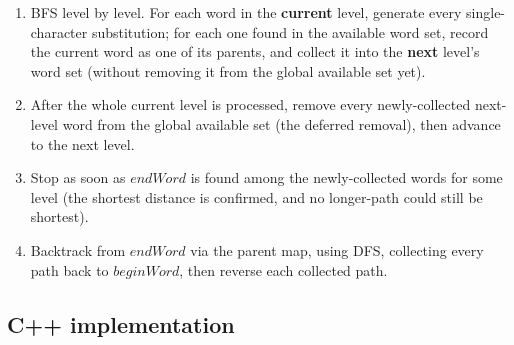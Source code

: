 \begin{enumerate}
  \item BFS level by level. For each word in the \textbf{current}
        level, generate every single-character substitution; for each
        one found in the available word set, record the current word
        as one of its parents, and collect it into the \textbf{next}
        level's word set (without removing it from the global
        available set yet).
  \item After the whole current level is processed, remove every
        newly-collected next-level word from the global available set
        (the deferred removal), then advance to the next level.
  \item Stop as soon as $\textit{endWord}$ is found among the
        newly-collected words for some level (the shortest distance is
        confirmed, and no longer-path could still be shortest).
  \item Backtrack from $\textit{endWord}$ via the parent map, using
        DFS, collecting every path back to $\textit{beginWord}$, then
        reverse each collected path.
\end{enumerate}

\subsection*{C++ implementation}

